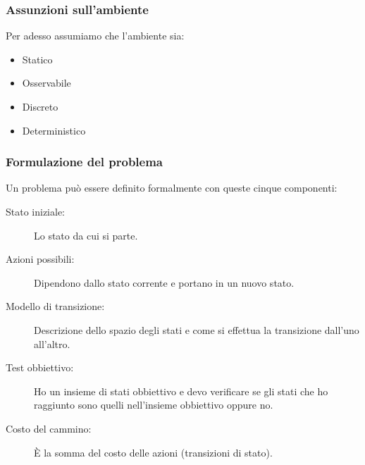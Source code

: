 \subsubsection{Assunzioni sull'ambiente}
Per adesso assumiamo che l'ambiente sia:
\begin{itemize}
	\item Statico
	\item Osservabile
	\item Discreto
	\item Deterministico
\end{itemize}

\subsubsection{Formulazione del problema}
Un problema pu\`o essere definito formalmente con queste cinque componenti:
\begin{description}
	\item[Stato iniziale:] Lo stato da cui si parte.
	\item[Azioni possibili:] Dipendono dallo stato corrente e portano in un nuovo stato.
	\item[Modello di transizione:] Descrizione dello spazio degli stati e come si effettua
	      la transizione dall'uno all'altro.
	\item[Test obbiettivo:] Ho un insieme di stati obbiettivo e devo verificare se gli stati
	      che ho raggiunto sono quelli nell'insieme obbiettivo oppure no.
	\item[Costo del cammino:] \`E la somma del costo delle azioni (transizioni di stato).
\end{description}